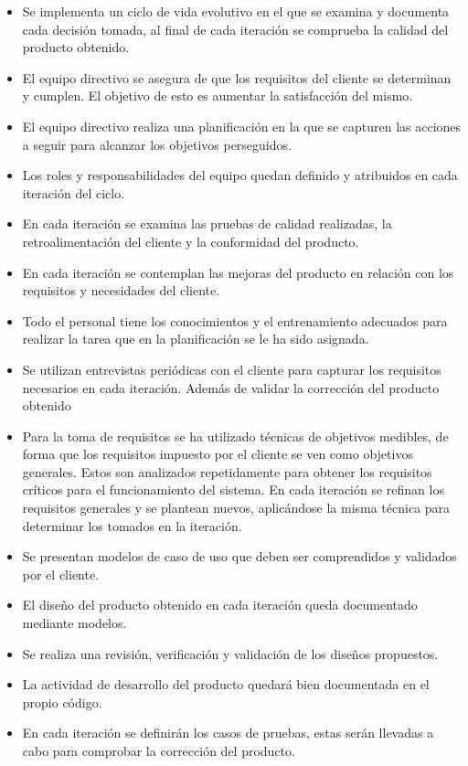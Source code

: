 \begin{itemize}
\item Se implementa un ciclo de vida evolutivo en el que se examina y documenta cada decisión tomada, al final de cada iteración se comprueba la calidad del producto obtenido.
\item El equipo directivo se asegura de que los requisitos del cliente se determinan y cumplen. El objetivo de esto es aumentar la satisfacción del mismo.
\item El equipo directivo realiza una planificación en la que se capturen las acciones a seguir para alcanzar los objetivos perseguidos.
\item Los roles y responsabilidades del equipo quedan definido y atribuidos en cada iteración del ciclo.
\item En cada iteración se examina las pruebas de calidad realizadas, la retroalimentación del cliente y la conformidad del producto.  
\item En cada iteración se contemplan las mejoras del producto en relación con los requisitos y necesidades del cliente.
\item Todo el personal tiene los conocimientos y el entrenamiento adecuados para realizar la tarea que en la planificación se le ha sido asignada.
\item Se utilizan entrevistas periódicas con el cliente para capturar los requisitos necesarios en cada iteración. Además de validar la corrección del producto obtenido
\item Para la toma de requisitos se ha utilizado técnicas de objetivos medibles, de forma que los requisitos impuesto por el cliente se ven como objetivos generales. 
Estos son analizados repetidamente para obtener los requisitos críticos para el funcionamiento del sistema. En cada iteración se refinan los requisitos generales y se plantean 
nuevos, aplicándose la misma técnica para determinar los tomados en la iteración. 
\item Se presentan modelos de caso de uso que deben ser comprendidos y validados por el cliente. 
\item El diseño del producto obtenido en cada iteración queda documentado mediante modelos.
\item Se realiza una revisión, verificación y validación de los diseños propuestos.
\item La actividad de desarrollo del producto quedará bien documentada en el propio código. 
\item En cada iteración se definirán los casos de pruebas, estas serán llevadas a cabo para comprobar la corrección del producto.
\end{itemize}

